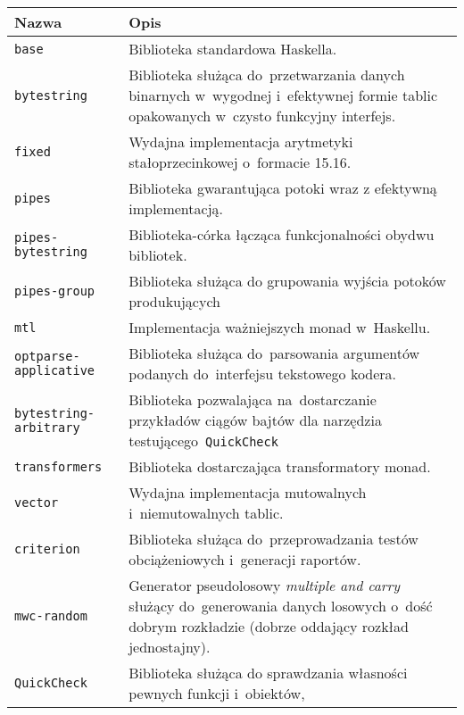 \documentclass[../../praca.tex]{subfiles}
\begin{document}
\begin{table}
  \centering
  \begin{tabular}{|l|p{8cm}|}
    \hline
    Nazwa & Opis \\ \hline
    \texttt{base}               & Biblioteka standardowa Haskella. \\ \hline
    \texttt{bytestring}         & Biblioteka służąca do~przetwarzania danych
                                  binarnych w~wygodnej i~efektywnej formie
                                  tablic opakowanych w~czysto funkcyjny interfejs. \\ \hline
    \texttt{fixed}              & Wydajna implementacja arytmetyki stałoprzecinkowej o~formacie 15.16. \\ \hline
    \texttt{pipes}              & Biblioteka gwarantująca potoki wraz z efektywną implementacją. \\ \hline
    \texttt{pipes-bytestring}   & Biblioteka-córka łącząca funkcjonalności obydwu bibliotek. \\ \hline
    \texttt{pipes-group}        & Biblioteka służąca do grupowania wyjścia potoków produkujących \\ \hline
    \texttt{mtl}                & Implementacja ważniejszych monad w~Haskellu. \\ \hline
    \texttt{optparse-applicative}&Biblioteka służąca do~parsowania argumentów podanych 
                                  do~interfejsu tekstowego kodera. \\ \hline
    \texttt{bytestring-arbitrary}&Biblioteka pozwalająca na~dostarczanie przykładów ciągów bajtów
                                  dla narzędzia testującego~\texttt{QuickCheck} \\ \hline
    \texttt{transformers}       & Biblioteka dostarczająca transformatory monad. \\ \hline
    \texttt{vector}             & Wydajna implementacja mutowalnych i~niemutowalnych tablic. \\ \hline
    \hline
    \texttt{criterion}          & Biblioteka służąca do~przeprowadzania testów obciążeniowych
                                  i~generacji raportów. \\ \hline
    \texttt{mwc-random}         & Generator pseudolosowy \emph{multiple and carry} służący 
                                  do~generowania danych losowych o~dość dobrym rozkładzie
                                  (dobrze oddający rozkład jednostajny). \\ \hline
    \texttt{QuickCheck}         & Biblioteka służąca do sprawdzania własności pewnych funkcji i~obiektów,

\end{tabular}
\end{table}
\end{document}
